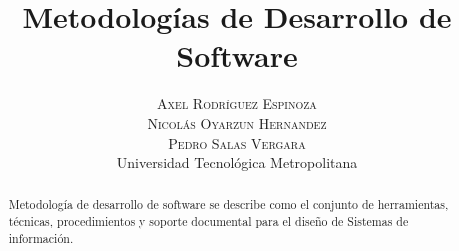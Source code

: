 \documentclass[twoside]{article}
\title{\vspace{-15mm}\fontsize{24pt}{10pt}\selectfont\textbf{Metodolog\'ias de Desarrollo de Software}} %
\author{
\large
\textsc{Axel Rodr\'iguez Espinoza}\\[2mm] %
\textsc{Nicol\'as Oyarzun Hernandez}\\[2mm] %
\textsc{Pedro Salas Vergara}\\[2mm] %
\normalsize Universidad Tecnol\'ogica Metropolitana \\ %
\vspace{-5mm}
}
\date{}
\begin{document}
\maketitle %

\thispagestyle{fancy} %


\begin{abstract}

Metodolog\'ia de desarrollo de software se describe como el conjunto de herramientas, t\'ecnicas, procedimientos y soporte documental para el dise\~no de Sistemas de informaci\'on.

\end{abstract}

\end{document}
